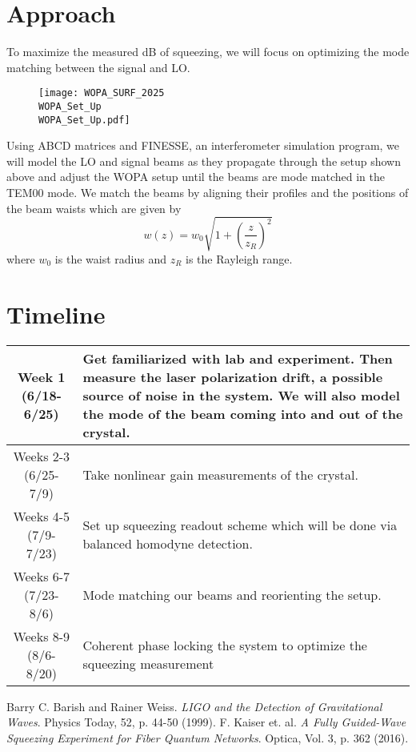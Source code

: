\documentclass[colorlinks=true,pdfstartview=FitV,linkcolor=blue,
citecolor=red,urlcolor=magenta]{ligodoc}
\begin{document}
\section{Approach}
To maximize the measured dB of squeezing, we will focus on optimizing the mode matching between the signal and LO.
\begin{figure}
    \texttt{[image: WOPA\_SURF\_2025\\WOPA\_Set\_Up\\WOPA\_Set\_Up.pdf]}
\end{figure}
    Using ABCD matrices and FINESSE, an interferometer simulation program, we will model the LO and signal beams as they propagate through the setup shown above and adjust the WOPA setup until the beams are mode matched in the TEM00 mode. We match the beams by aligning their profiles and the positions of the beam waists which are given by
$$w(z)=w_0\sqrt{1+\left(\frac{z}{z_R}\right)^2}$$
where $w_0$ is the waist radius and $z_R$ is the Rayleigh range. 
\section{Timeline}
\begin{center}
\begin{tabular}{|c|m{13cm}|}
    \hline
    Week 1 (6/18-6/25) & Get familiarized with lab and experiment. Then measure the laser polarization drift, a possible source of noise in the system. We will also model the mode of the beam coming into and out of the crystal.\\
   \hline
    Weeks 2-3 (6/25-7/9) & Take nonlinear gain measurements of the crystal.\\
    \hline
    Weeks 4-5 (7/9-7/23) & Set up squeezing readout scheme which will be done via balanced homodyne detection. \\
    \hline
    Weeks 6-7 (7/23-8/6) & Mode matching our beams and reorienting the setup.\\
    \hline
    Weeks 8-9 (8/6-8/20) & Coherent phase locking the system to optimize the squeezing measurement\\
    \hline
\end{tabular}
\end{center}    
\begin{thebibliography}{9}
 Barry C. Barish and Rainer Weiss. \emph{LIGO and the Detection of Gravitational Waves}. Physics Today, 52, p. 44-50 (1999).
 F. Kaiser et. al. \emph{A Fully Guided-Wave Squeezing Experiment for Fiber Quantum Networks}. Optica, Vol. 3, p. 362 (2016).

\end{thebibliography}
\end{document}
